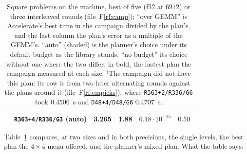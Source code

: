 \documentclass[11pt]{article}
\newcommand{\rf}[1]{F\ref{rf:#1}}
\newcommand{\lv}[1]{\texttt{#1}}
\begin{document}
\begin{table}[tp]
\begin{tabular}{llrrrr}
\rowcolor{cR!12} & \lv{R363+4/R336/G3} (auto) & 3.265 & 1.88 & $6.18\cdot10^{-15}$ & $0.50$\\
\bottomrule
\end{tabular}
\caption{Square problems on the machine, best of five (f32 at $6912$) or
three interleaved rounds (file~\rf{camp}); ``over GEMM'' is Accelerate's best time in the campaign divided by the plan's, and the last column the plan's error as a multiple of the GEMM's.  ``auto'' (shaded) is the planner's choice under its default budget as the library stands, ``no budget'' its choice
without one where the two differ; in bold, the fastest plan the campaign measured at each
size.  $^\dagger$The campaign did not have this plan: its row is from two later alternating rounds against the plans around it (file~\rf{empicks}), where \lv{R363+2/R336/G6} took $0.4506$~s and \lv{D48+4/D48/G6} $0.4707$~s.}
\label{tab:results}
\end{table}

Table~\ref{tab:results} compares, at two sizes and in both precisions, the
single levels, the best plan the $4\times4$ menu offered, and the planner's
mixed plan.  What the table says:
\end{document}
